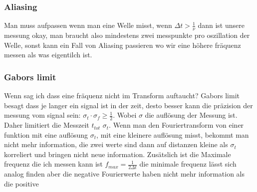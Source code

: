 \documentclass{article}
\begin{document}
\subsubsection*{Aliasing} Man muss aufpassen wenn man eine Welle misst, wenn $\Delta t>\frac{1}{\nu}$ dann ist unsere messung okay, man braucht also mindestens zwei messpunkte pro oszillation der Welle, sonst kann ein Fall von Aliasing passieren wo wir eine höhere fräquenz messen als was eigentilch ist.
\subsubsection*{Gabors limit} Wenn sag ich dass eine fräquenz nicht im Transform auftaucht? Gabors limit besagt dass je langer ein signal ist in der zeit, desto besser kann die präzision der messung vom signal sein: $\sigma_t\cdot\sigma_f\ge\frac{1}{2}$. Wobei $\sigma$ die auflösung der Messung ist.
Daher limitiert die Messzeit $t_{tot}$ $\sigma_t$. Wenn man den Fouriertransform von einer funktion mit eine auflösung $\sigma_t$, mit eine kleinere auflösung misst, bekommt man nicht mehr information, die zwei werte sind dann auf distanzen kleine als $\sigma_t$ korreliert und bringen nicht neue information.
Zusätslich ist die Maximale frequenz die ich messen kann ist $f_{max}=\frac{1}{2\Delta t}$ die minimale frequenz lässt sich analog finden aber die negative Fourierwerte haben nicht mehr information als die positive
\end{document}
